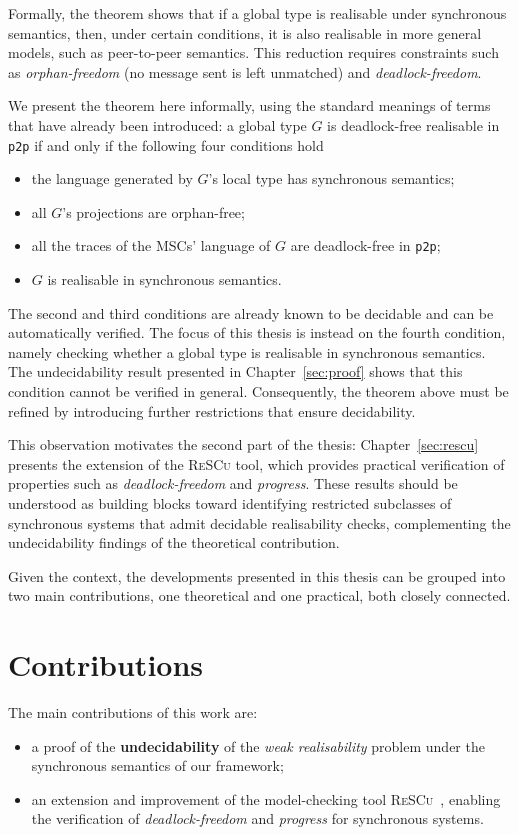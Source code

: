 Formally, the theorem shows that if a global type is realisable under
synchronous semantics, then, under certain conditions, it is also
realisable in more general models, such as peer-to-peer semantics. This
reduction requires constraints such as \emph{orphan-freedom} (no message 
sent is left unmatched) and \emph{deadlock-freedom}.  

We present the theorem here informally, using the standard meanings of
terms that have already been introduced:
a global type $G$ is deadlock-free realisable in \verb|p2p| if and only if
the following four conditions hold
\begin{itemize}
  \item the language generated by $G$'s local type has synchronous semantics;
  \item all $G$'s projections are orphan-free;
  \item all the traces of the MSCs' language of $G$ are deadlock-free
  in \verb|p2p|;
  \item $G$ is realisable in synchronous semantics.
\end{itemize}

The second and third conditions are already known to be decidable and 
can be automatically verified. The focus of this thesis is instead on 
the fourth condition, namely checking whether a global type is 
realisable in synchronous semantics. The undecidability result 
presented in Chapter~\ref{sec:proof} shows that this condition cannot 
be verified in general. Consequently, the theorem above must be refined 
by introducing further restrictions that ensure decidability.  

This observation motivates the second part of the thesis: 
Chapter~\ref{sec:rescu} presents the extension of the 
\textsc{ReSCu} tool, which provides practical verification of 
properties such as \emph{deadlock-freedom} and \emph{progress}. These 
results should be understood as building blocks toward identifying 
restricted subclasses of synchronous systems that admit decidable 
realisability checks, complementing the undecidability findings of 
the theoretical contribution.

Given the context, the developments presented in this thesis can be 
grouped into two main
contributions, one theoretical and one practical, both closely
connected.

\section{Contributions}
The main contributions of this work are: 
\begin{itemize}
    \item a proof of the \textbf{undecidability} of the 
    \textit{weak realisability} problem under the synchronous 
    semantics of our framework;
    \item an extension and improvement of the model-checking tool 
    \textsc{ReSCu}~\cite{rescurepo}, enabling the verification of 
    \textit{deadlock-freedom} and \textit{progress} for synchronous 
    systems.
\end{itemize}

